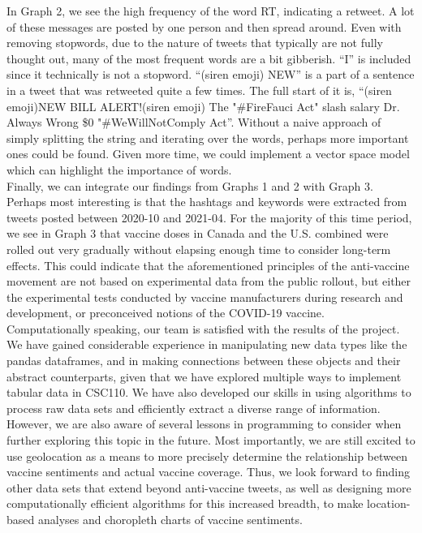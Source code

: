 \documentclass[fontsize=11pt]{article}
\begin{document}
In Graph 2, we see the high frequency of the word RT, indicating a retweet. A lot of these messages are posted by one person and then spread around. Even with removing stopwords, due to the nature of tweets that typically are not fully thought out, many of the most frequent words are a bit gibberish. “I” is included since it technically is not a stopword. “(siren emoji) NEW” is a part of a sentence in a tweet that was retweeted quite a few times. The full start of it is, “(siren emoji)NEW BILL ALERT!(siren emoji) The "\#FireFauci Act" slash salary Dr. Always Wrong \$0 "\#WeWillNotComply Act”. Without a naive approach of simply splitting the string and iterating over the words, perhaps more important ones could be found. Given more time, we could implement a vector space model which can highlight the importance of words. \\

Finally, we can integrate our findings from Graphs 1 and 2 with Graph 3. Perhaps most interesting is that the hashtags and keywords were extracted from tweets posted between 2020-10 and 2021-04. For the majority of this time period, we see in Graph 3 that vaccine doses in Canada and the U.S. combined were rolled out very gradually without elapsing enough time to consider long-term effects. This could indicate that the aforementioned principles of the anti-vaccine movement are not based on experimental data from the public rollout, but either the experimental tests conducted by vaccine manufacturers during research and development, or preconceived notions of the COVID-19 vaccine. \\

Computationally speaking, our team is satisfied with the results of the project. We have gained considerable experience in manipulating new data types like the pandas dataframes, and in making connections between these objects and their abstract counterparts, given that we have explored multiple ways to implement tabular data in CSC110. We have also developed our skills in using algorithms to process raw data sets and efficiently extract a diverse range of information. \\

However, we are also aware of several lessons in programming to consider when further exploring this topic in the future. Most importantly, we are still excited to use geolocation as a means to more precisely determine the relationship between vaccine sentiments and actual vaccine coverage. Thus, we look forward to finding other data sets that extend beyond anti-vaccine tweets, as well as designing more computationally efficient algorithms for this increased breadth, to make location-based analyses and choropleth charts of vaccine sentiments.
\end{document}
